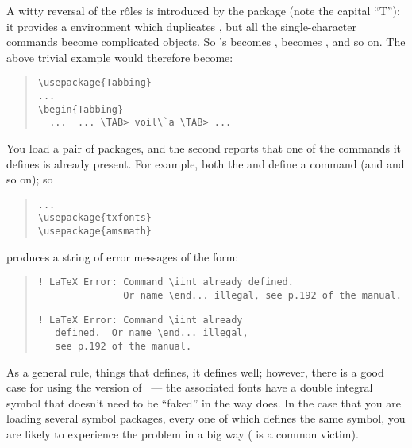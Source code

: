 A witty reversal of the r\^oles is introduced by the package
 (note the capital ``T''): it provides a
 environment which duplicates
, but all the single-character commands become
complicated objects.  So 's \csx{>} becomes
, \csx{=} becomes , and so on.  The above trivial
example would therefore become:
\begin{quote}
\begin{verbatim}
\usepackage{Tabbing}
...
\begin{Tabbing}
  ...  ... \TAB> voil\`a \TAB> ...
\end{verbatim}
\end{quote}
\begin{ctanrefs}
\item[Tabbing.sty]
\end{ctanrefs}


You load a pair of packages, and the second reports that one of the
commands it defines is already present.  For example, both the
 and  define a command 
(and  and so on); so
\begin{quote}
\begin{verbatim}
...
\usepackage{txfonts}
\usepackage{amsmath}
\end{verbatim}
\end{quote}
produces a string of error messages of the form:
\begin{quote}
\begin{wideversion}
\begin{verbatim}
! LaTeX Error: Command \iint already defined.
               Or name \end... illegal, see p.192 of the manual.
\end{verbatim}
\end{wideversion}
\begin{narrowversion}
\begin{verbatim}
! LaTeX Error: Command \iint already
   defined.  Or name \end... illegal,
   see p.192 of the manual.
\end{verbatim}
\end{narrowversion}
\end{quote}
As a general rule, things that  defines, it defines
well; however, there is a good case for using the 
version of ~--- the associated  fonts have a
double integral symbol that doesn't need to be ``faked'' in the way
 does.  In the case that you are loading several
symbol packages, every one of which defines the same symbol, you are
likely to experience the problem in a big way ( is a common
victim).

